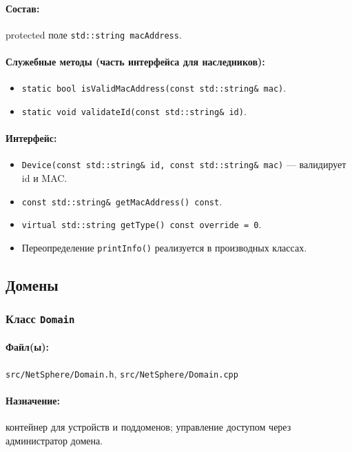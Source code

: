 \documentclass[14pt,a4paper]{extarticle}
\begin{document}
\paragraph{Состав:}
protected поле \texttt{std::string macAddress}.
\paragraph{Служебные методы (часть интерфейса для наследников):}
\begin{itemize}
  \item \texttt{static bool isValidMacAddress(const std::string\& mac)}.
  \item \texttt{static void validateId(const std::string\& id)}.
\end{itemize}
\paragraph{Интерфейс:}
\begin{itemize}
  \item \texttt{Device(const std::string\& id, const std::string\& mac)} --- валидирует id и MAC.
  \item \texttt{const std::string\& getMacAddress() const}.
  \item \texttt{virtual std::string getType() const override = 0}.
  \item Переопределение \texttt{printInfo()} реализуется в производных классах.
\end{itemize}

\subsection{Домены}
\subsubsection{Класс \texttt{Domain}}
\paragraph{Файл(ы):} \texttt{src/NetSphere/Domain.h}, \texttt{src/NetSphere/Domain.cpp}
\paragraph{Назначение:} контейнер для устройств и поддоменов; управление доступом через администратор домена.
\end{document}
